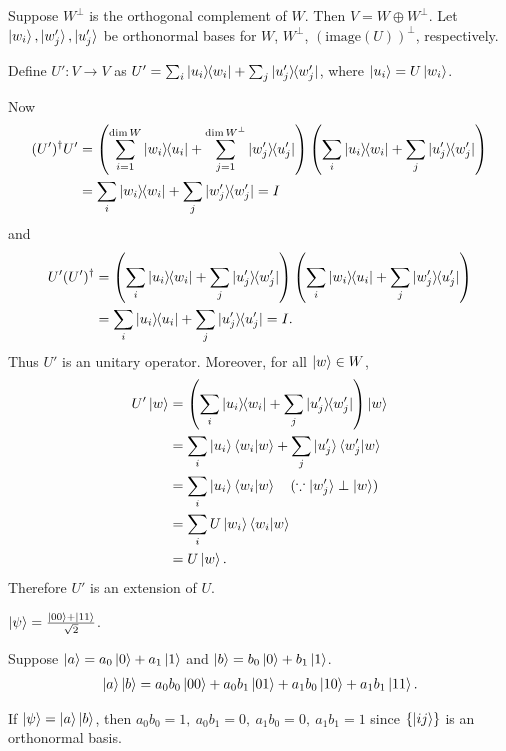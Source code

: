Suppose $W^\perp$ is the orthogonal complement of $W$. Then $V = W \oplus W^\perp$.
Let $\ket{w_i},\ket{w_j'},\ket{u_j'}$ be orthonormal bases for $W$, $W^\perp$, $\left( \mathrm{image}(U) \right)^\perp$, respectively.

Define $U': V \rightarrow V$ as $U' = \sum_i \ket{u_i}\hspace{-1mm} \bra{w_i} + \sum_j \ket{u_j'}\hspace{-1mm} \bra{w_j'}$,
where $\ket{u_i} = U \ket{w_i}$.


Now
\begin{align*}
    (U')^\dagger U' &= \left( \sum_{i = 1}^{\dim W} \ket{w_i}\hspace{-1mm} \bra{u_i} + \sum_{j = 1}^{\dim W^\perp} \ket{w_j'}\hspace{-1mm} \bra{u_j'} \right)  \left( \sum_i \ket{u_i}\hspace{-1mm} \bra{w_i} + \sum_j \ket{u_j'}\hspace{-1mm} \bra{w_j'} \right)\\
                    &= \sum_i \ket{w_i}\hspace{-1mm} \bra{w_i} + \sum_j \ket{w_j'}\hspace{-1mm} \bra{w_j'} = I
\end{align*}
%
and
%
\begin{align*}
    U' (U')^\dagger &= \left( \sum_i \ket{u_i}\hspace{-1mm} \bra{w_i} + \sum_j \ket{u_j'}\hspace{-1mm} \bra{w_j'} \right) \left( \sum_i \ket{w_i}\hspace{-1mm} \bra{u_i} + \sum_j \ket{w_j'}\hspace{-1mm} \bra{u_j'} \right)\\
                    &= \sum_i \ket{u_i}\hspace{-1mm} \bra{u_i} + \sum_j \ket{u_j'}\hspace{-1mm} \bra{u_j'} = I.
\end{align*}
%
Thus $U'$ is an unitary operator.
Moreover, for all $\ket{w} \in W$,
\begin{align*}
    U' \ket{w} &= \left( \sum_i \ket{u_i}\hspace{-1mm} \bra{w_i} + \sum_j \ket{u_j'}\hspace{-1mm} \bra{w_j'} \right) \ket{w}\\
               &= \sum_i \ket{u_i} \braket{w_i | w} + \sum_j \ket{u_j'} \braket{w_j' | w}\\
			   &= \sum_i \ket{u_i} \braket{w_i | w}  ~~~(\because \ket{w_j'} \perp \ket{w})\\
			   &= \sum_i U \ket{w_i} \braket{w_i | w}\\
			   &= U \ket{w}.
\end{align*}
%
Therefore $U'$ is an extension of $U$.



$\ket{\psi} = \frac{\ket{00} + \ket{11}}{\sqrt{2}}$.

Suppose $\ket{a} = a_0 \ket{0}  + a_1\ket{1}$ and $\ket{b} = b_0 \ket{0}  + b_1\ket{1}$.
%
\begin{align*}
    \ket{a} \ket{b} = a_0 b_0 \ket{00} + a_0 b_1 \ket{01} + a_1 b_0 \ket{10} + a_1 b_1 \ket{11}.
\end{align*}

If $\ket{\psi} = \ket{a} \ket{b}$, then $a_0 b_0 = 1,~ a_0 b_1=0,~ a_1 b_0 = 0,~ a_1 b_1 = 1$ since $\{\ket{ij}\}$ is an orthonormal basis.

